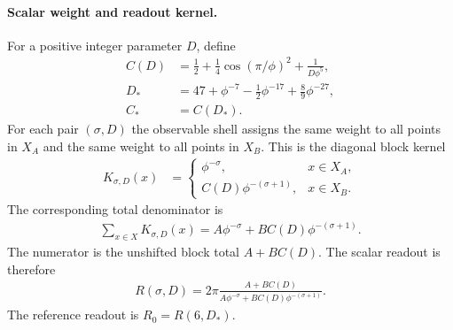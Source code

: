 \paragraph{Scalar weight and readout kernel.}
For a positive integer parameter $D$, define
$$
\begin{aligned}
C(D)&=\frac{1}{2}+\frac{1}{4}\cos(\pi/\phi)^2+\frac{1}{D\phi^5},\\
D_\ast&=47+\phi^{-7}-\frac{1}{2}\phi^{-17}+\frac{8}{9}\phi^{-27},\\
C_\ast&=C(D_\ast).
\end{aligned}
$$
For each pair $(\sigma,D)$ the observable shell assigns the same weight to all points in $X_A$ and the same weight to all points in $X_B$. This is the diagonal block kernel
$$
\begin{aligned}
K_{\sigma,D}(x)&=
\begin{cases}
\phi^{-\sigma},&x\in X_A,\\
C(D)\phi^{-(\sigma+1)},&x\in X_B.
\end{cases}
\end{aligned}
$$
The corresponding total denominator is
$$
\begin{aligned}
\sum_{x\in X}K_{\sigma,D}(x)=A\phi^{-\sigma}+B C(D)\phi^{-(\sigma+1)}.
\end{aligned}
$$
The numerator is the unshifted block total $A+B C(D)$. The scalar readout is therefore
$$
\begin{aligned}
R(\sigma,D)=2\pi\frac{A+B C(D)}{A\phi^{-\sigma}+B C(D)\phi^{-(\sigma+1)}}.
\end{aligned}
$$
The reference readout is $R_0=R(6,D_\ast)$.

